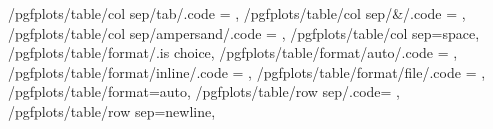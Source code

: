 {	/pgfplots/table/col sep/tab/.code		= {\def\pgfplotstableread@COLSEP@CASE{5}},
	/pgfplots/table/col sep/&/.code			= {\def\pgfplotstableread@COLSEP@CASE{6}\pgfplotstable@trimcellstrue},
	/pgfplots/table/col sep/ampersand/.code	= {\def\pgfplotstableread@COLSEP@CASE{6}\pgfplotstable@trimcellstrue},
	/pgfplots/table/col sep=space,
	/pgfplots/table/format/.is choice,
	/pgfplots/table/format/auto/.code		= {\def\pgfplotstableread@FORMAT@CASE{0}},
	/pgfplots/table/format/inline/.code		= {\def\pgfplotstableread@FORMAT@CASE{1}},
	/pgfplots/table/format/file/.code		= {\def\pgfplotstableread@FORMAT@CASE{2}},
	/pgfplots/table/format=auto,
	/pgfplots/table/row sep/.code={%
	},%
	/pgfplots/table/row sep=newline,
}


